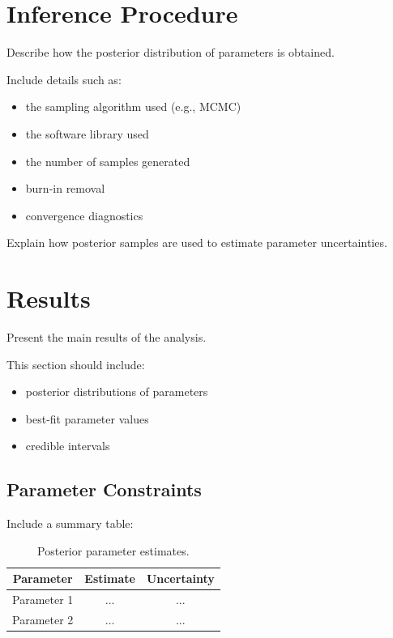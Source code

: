 \documentclass[11pt]{article}
\begin{document}
\section{Inference Procedure}

Describe how the posterior distribution of parameters is obtained.

Include details such as:
\begin{itemize}
\item the sampling algorithm used (e.g., MCMC)
\item the software library used
\item the number of samples generated
\item burn-in removal
\item convergence diagnostics
\end{itemize}

Explain how posterior samples are used to estimate parameter
uncertainties.

\section{Results}

Present the main results of the analysis.

This section should include:
\begin{itemize}
\item posterior distributions of parameters
\item best-fit parameter values
\item credible intervals
\end{itemize}

\subsection{Parameter Constraints}

Include a summary table:
\begin{table}[h]
\centering
\begin{tabular}{ccc}
\toprule
Parameter & Estimate & Uncertainty \\
\midrule
Parameter 1 & ... & ... \\
Parameter 2 & ... & ... \\
\bottomrule
\end{tabular}
\caption{Posterior parameter estimates.}
\end{table}
\end{document}
